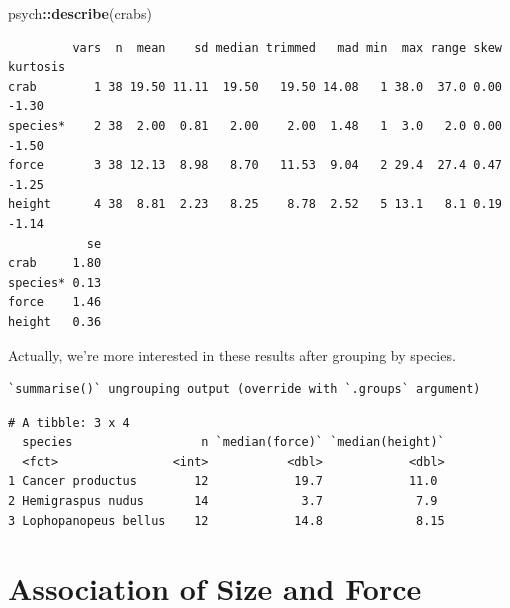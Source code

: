 \documentclass[
]{book}
\newenvironment{Shaded}{\begin{snugshade}}{\end{snugshade}}
\newcommand{\DataTypeTok}[1]{\textcolor[rgb]{0.13,0.29,0.53}{#1}}
\newcommand{\KeywordTok}[1]{\textcolor[rgb]{0.13,0.29,0.53}{\textbf{#1}}}
\newcommand{\NormalTok}[1]{#1}
\newcommand{\OperatorTok}[1]{\textcolor[rgb]{0.81,0.36,0.00}{\textbf{#1}}}
\newcommand{\StringTok}[1]{\textcolor[rgb]{0.31,0.60,0.02}{#1}}
\begin{document}
\begin{Shaded}
\begin{Highlighting}[]
\NormalTok{psych}\OperatorTok{::}\KeywordTok{describe}\NormalTok{(crabs)}
\end{Highlighting}
\end{Shaded}

\begin{verbatim}
         vars  n  mean    sd median trimmed   mad min  max range skew kurtosis
crab        1 38 19.50 11.11  19.50   19.50 14.08   1 38.0  37.0 0.00    -1.30
species*    2 38  2.00  0.81   2.00    2.00  1.48   1  3.0   2.0 0.00    -1.50
force       3 38 12.13  8.98   8.70   11.53  9.04   2 29.4  27.4 0.47    -1.25
height      4 38  8.81  2.23   8.25    8.78  2.52   5 13.1   8.1 0.19    -1.14
           se
crab     1.80
species* 0.13
force    1.46
height   0.36
\end{verbatim}

Actually, we're more interested in these results after grouping by species.

\begin{Shaded}
\end{Shaded}

\begin{verbatim}
`summarise()` ungrouping output (override with `.groups` argument)
\end{verbatim}

\begin{verbatim}
# A tibble: 3 x 4
  species                  n `median(force)` `median(height)`
  <fct>                <int>           <dbl>            <dbl>
1 Cancer productus        12            19.7            11.0 
2 Hemigraspus nudus       14             3.7             7.9 
3 Lophopanopeus bellus    12            14.8             8.15
\end{verbatim}

\hypertarget{association-of-size-and-force}{%
\section{Association of Size and Force}\label{association-of-size-and-force}}
\end{document}
